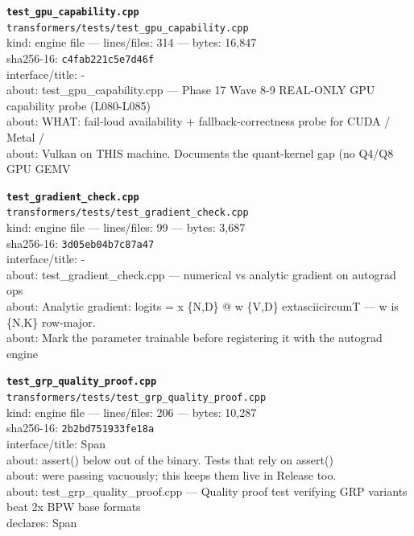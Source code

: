 \noindent\textbf{\texttt{test\_gpu\_capability.cpp}}\\
\texttt{transformers/tests/test\_gpu\_capability.cpp}\\
kind: engine file --- lines/files: 314 --- bytes: 16,847\\
sha256-16: \texttt{c4fab221c5e7d46f}\\
interface/title: -\\
about: test\_gpu\_capability.cpp — Phase 17 Wave 8-9 REAL-ONLY GPU capability probe (L080-L085)\\
about: WHAT: fail-loud availability + fallback-correctness probe for CUDA / Metal /\\
about: Vulkan on THIS machine. Documents the quant-kernel gap (no Q4/Q8 GPU GEMV\\
\vspace*{6.0pt}

\noindent\textbf{\texttt{test\_gradient\_check.cpp}}\\
\texttt{transformers/tests/test\_gradient\_check.cpp}\\
kind: engine file --- lines/files: 99 --- bytes: 3,687\\
sha256-16: \texttt{3d05eb04b7c87a47}\\
interface/title: -\\
about: test\_gradient\_check.cpp — numerical vs analytic gradient on autograd ops\\
about: Analytic gradient: logits = x \{N,D\} @ w \{V,D\}	extasciicircum{}T — w is \{N,K\} row-major.\\
about: Mark the parameter trainable before registering it with the autograd engine\\
\vspace*{6.0pt}

\noindent\textbf{\texttt{test\_grp\_quality\_proof.cpp}}\\
\texttt{transformers/tests/test\_grp\_quality\_proof.cpp}\\
kind: engine file --- lines/files: 206 --- bytes: 10,287\\
sha256-16: \texttt{2b2bd751933fe18a}\\
interface/title: Span\\
about: assert() below out of the binary. Tests that rely on assert()\\
about: were passing vacuously; this keeps them live in Release too.\\
about: test\_grp\_quality\_proof.cpp — Quality proof test verifying GRP variants beat 2x BPW base formats\\
declares: Span\\
\vspace*{6.0pt}
\newpage

